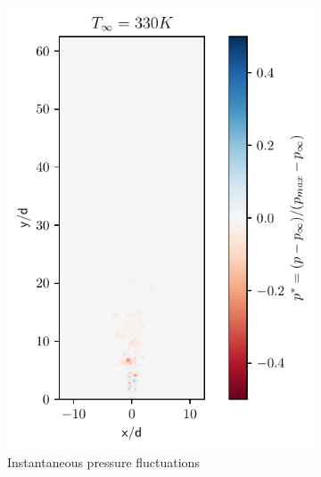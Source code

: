 \begin{figure}[htbp!]
\begin{subfigure}{0.25\textwidth}
	\centering
	\includegraphics[scale=.65]{figures/Plots/vertical/330/pressure_scaled_vert_330.pdf}
	\caption{Instantaneous pressure fluctuations} \label{330_pressure_1}
\end{subfigure}
\hfill
\begin{subfigure}{0.25\textwidth}
	\centering

\end{subfigure}
\end{figure}
